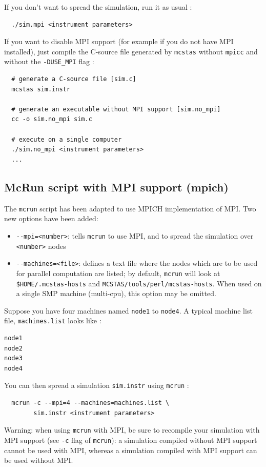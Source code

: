 If you don't want to spread the simulation, run it as usual :
\begin{verbatim}
  ./sim.mpi <instrument parameters>
\end{verbatim}

If you want to disable MPI support (for example if you do not have MPI
installed), just compile the C-source file generated by \verb'mcstas'
  without \verb'mpicc' and without the \verb'-DUSE_MPI' flag :
\begin{verbatim}
  # generate a C-source file [sim.c]
  mcstas sim.instr

  # generate an executable without MPI support [sim.no_mpi]
  cc -o sim.no_mpi sim.c

  # execute on a single computer
  ./sim.no_mpi <instrument parameters>
  ...
\end{verbatim}

\subsection{McRun script with MPI support (mpich)}

The \verb'mcrun' script has been adapted to use MPICH implementation
of MPI. Two new options have been added:
\begin{itemize}
\item \verb'--mpi=<number>': tells \verb'mcrun' to use MPI, and to
  spread the simulation over \verb'<number>' nodes
\item \verb'--machines=<file>': defines a text file where the
  nodes which are to be used for parallel computation are listed; by
  default, \verb'mcrun' will look at \verb'$HOME/.mcstas-hosts' and
  \verb'MCSTAS/tools/perl/mcstas-hosts'. When used on a single SMP machine (multi-cpu), this option may be omitted.
\end{itemize}

Suppose you have four machines named \verb'node1' to \verb'node4'.
A typical machine list file, \verb'machines.list' looks like :
\begin{verbatim}
node1
node2
node3
node4
\end{verbatim}

You can then spread a simulation \verb'sim.instr' using \verb'mcrun' :
\begin{verbatim}
  mcrun -c --mpi=4 --machines=machines.list \
        sim.instr <instrument parameters>
\end{verbatim}

\begin{paragraph}{Warning:} when using \verb'mcrun' with MPI, be sure
  to recompile your simulation with MPI support (see \verb'-c' flag of
  \verb'mcrun'): a simulation compiled without MPI support cannot be
  used with MPI, whereas a simulation compiled with MPI support can be
  used without MPI.
\end{paragraph}

